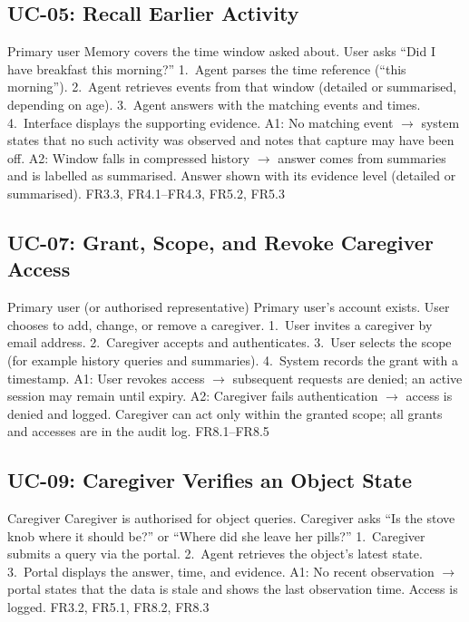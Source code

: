 \subsection{UC-05: Recall Earlier Activity}
{Primary user}
{Memory covers the time window asked about.}
{User asks ``Did I have breakfast this morning?''}
{1.~Agent parses the time reference (``this morning''). 2.~Agent retrieves
events from that window (detailed or summarised, depending on age). 3.~Agent
answers with the matching events and times. 4.~Interface displays the
supporting evidence.}
{A1: No matching event $\rightarrow$ system states that no such activity was
observed and notes that capture may have been off. A2: Window falls in
compressed history $\rightarrow$ answer comes from summaries and is labelled
as summarised.}
{Answer shown with its evidence level (detailed or summarised).}
{FR3.3, FR4.1--FR4.3, FR5.2, FR5.3}

\subsection{UC-07: Grant, Scope, and Revoke Caregiver Access}
{Primary user (or authorised representative)}
{Primary user's account exists.}
{User chooses to add, change, or remove a caregiver.}
{1.~User invites a caregiver by email address. 2.~Caregiver accepts and
authenticates. 3.~User selects the scope (for example history queries and
summaries). 4.~System records the grant with a timestamp.}
{A1: User revokes access $\rightarrow$ subsequent requests are denied; an active session may remain until expiry.
A2: Caregiver fails authentication $\rightarrow$ access is denied and logged.}
{Caregiver can act only within the granted scope; all grants and accesses are
in the audit log.}
{FR8.1--FR8.5}

\subsection{UC-09: Caregiver Verifies an Object State}
{Caregiver}
{Caregiver is authorised for object queries.}
{Caregiver asks ``Is the stove knob where it should be?'' or ``Where did she
leave her pills?'' }
{1.~Caregiver submits a query via the portal. 2.~Agent retrieves the object's
latest state. 3.~Portal displays the answer, time, and evidence.}
{A1: No recent observation $\rightarrow$ portal states that the data is stale
and shows the last observation time.}
{Access is logged.}
{FR3.2, FR5.1, FR8.2, FR8.3}

